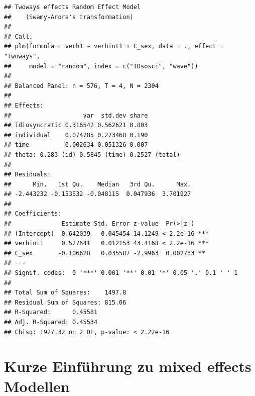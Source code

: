 \documentclass[
]{book}
\begin{document}
\begin{verbatim}
## Twoways effects Random Effect Model 
##    (Swamy-Arora's transformation)
## 
## Call:
## plm(formula = verh1 ~ verhint1 + C_sex, data = ., effect = "twoways", 
##     model = "random", index = c("IDsosci", "wave"))
## 
## Balanced Panel: n = 576, T = 4, N = 2304
## 
## Effects:
##                    var  std.dev share
## idiosyncratic 0.316542 0.562621 0.803
## individual    0.074785 0.273468 0.190
## time          0.002634 0.051326 0.007
## theta: 0.283 (id) 0.5845 (time) 0.2527 (total)
## 
## Residuals:
##      Min.   1st Qu.    Median   3rd Qu.      Max. 
## -2.443232 -0.153532 -0.048115  0.047936  3.701927 
## 
## Coefficients:
##              Estimate Std. Error z-value  Pr(>|z|)    
## (Intercept)  0.642039   0.045454 14.1249 < 2.2e-16 ***
## verhint1     0.527641   0.012153 43.4168 < 2.2e-16 ***
## C_sex       -0.106628   0.035587 -2.9963  0.002733 ** 
## ---
## Signif. codes:  0 '***' 0.001 '**' 0.01 '*' 0.05 '.' 0.1 ' ' 1
## 
## Total Sum of Squares:    1497.8
## Residual Sum of Squares: 815.06
## R-Squared:      0.45581
## Adj. R-Squared: 0.45534
## Chisq: 1927.32 on 2 DF, p-value: < 2.22e-16
\end{verbatim}

\hypertarget{kurze-einfuxfchrung-zu-mixed-effects-modellen}{%
\section{Kurze Einführung zu mixed effects Modellen}\label{kurze-einfuxfchrung-zu-mixed-effects-modellen}}
\end{document}
